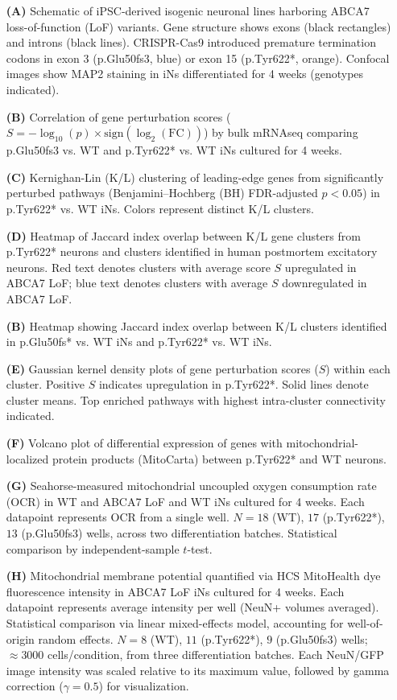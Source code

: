 \documentclass[12pt]{article}
\begin{document}
\begin{itemize}
    \item[\textbf{(A)}] Schematic of iPSC-derived isogenic neuronal lines harboring ABCA7 loss-of-function (LoF) variants. Gene structure shows exons (black rectangles) and introns (black lines). CRISPR-Cas9 introduced premature termination codons in exon 3 (p.Glu50fs3, blue) or exon 15 (p.Tyr622*, orange). Confocal images show MAP2 staining in iNs differentiated for 4 weeks (genotypes indicated).
    \item[\textbf{(B)}] Correlation of gene perturbation scores ($S = -\log_{10}(p)\times\text{sign}(\log_2(\text{FC}))$) by bulk mRNAseq comparing p.Glu50fs3 vs. WT and p.Tyr622* vs. WT iNs cultured for 4 weeks.
    \item[\textbf{(C)}] Kernighan-Lin (K/L) clustering of leading-edge genes from significantly perturbed pathways (Benjamini–Hochberg (BH) FDR-adjusted $p<0.05$) in p.Tyr622* vs. WT iNs. Colors represent distinct K/L clusters.
    \item[\textbf{(D)}] Heatmap of Jaccard index overlap between K/L gene clusters from p.Tyr622* neurons and clusters identified in human postmortem excitatory neurons. Red text denotes clusters with average score $S$ upregulated in ABCA7 LoF; blue text denotes clusters with average $S$ downregulated in ABCA7 LoF.
    \item[\textbf{(B)}] Heatmap showing Jaccard index overlap between K/L clusters identified in p.Glu50fs* vs. WT iNs and p.Tyr622* vs. WT iNs.
    \item[\textbf{(E)}] Gaussian kernel density plots of gene perturbation scores ($S$) within each cluster. Positive $S$ indicates upregulation in p.Tyr622*. Solid lines denote cluster means. Top enriched pathways with highest intra-cluster connectivity indicated.
    \item[\textbf{(F)}] Volcano plot of differential expression of genes with mitochondrial-localized protein products (MitoCarta) between p.Tyr622* and WT neurons.
    \item[\textbf{(G)}] Seahorse-measured mitochondrial uncoupled oxygen consumption rate (OCR) in WT and ABCA7 LoF and WT iNs cultured for 4 weeks. Each datapoint represents OCR from a single well. $N=18$ (WT), $17$ (p.Tyr622*), $13$ (p.Glu50fs3) wells, across two differentiation batches. Statistical comparison by independent-sample $t$-test.
    \item[\textbf{(H)}] Mitochondrial membrane potential quantified via HCS MitoHealth dye fluorescence intensity in ABCA7 LoF iNs cultured for 4 weeks. Each datapoint represents average intensity per well (NeuN+ volumes averaged). Statistical comparison via linear mixed-effects model, accounting for well-of-origin random effects. $N=8$ (WT), $11$ (p.Tyr622*), $9$ (p.Glu50fs3) wells; $\approx3000$ cells/condition, from three differentiation batches. Each NeuN/GFP image intensity was scaled relative to its maximum value, followed by gamma correction ($\gamma = 0.5$) for visualization.

\end{itemize}
\end{document}
